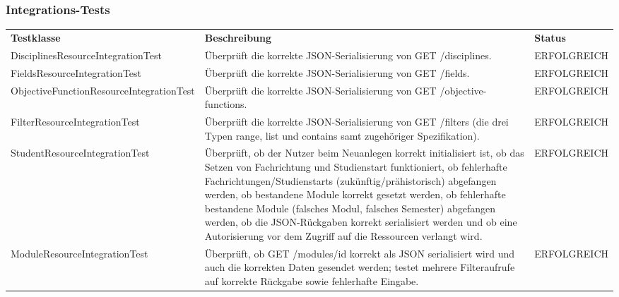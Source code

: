 \subsubsection*{Integrations-Tests}

\begin{longtable}{| >{\hspace{0pt}} p{} | >{\hspace{0pt}} p{} | >{\hspace{0pt}} p{} |}
	\hline
	\textbf{Testklasse} & \textbf{Beschreibung} & \textbf{Status} \\ 
	\hhline{|=|=|=|}  
	\endfirsthead
	\endhead
	DisciplinesResourceIntegrationTest & Überprüft die korrekte JSON-Serialisierung von GET /disciplines. & ERFOLGREICH \\
	\hline
	FieldsResourceIntegrationTest & Überprüft die korrekte JSON-Serialisierung von GET /fields. & ERFOLGREICH \\
	\hline
	ObjectiveFunctionResourceIntegrationTest & Überprüft die korrekte JSON-Serialisierung von GET /objective-functions. & ERFOLGREICH \\
	\hline
	FilterResourceIntegrationTest & Überprüft die korrekte JSON-Serialisierung von GET /filters (die drei Typen range, list und contains samt zugehöriger Spezifikation). & ERFOLGREICH \\
	\hline
	StudentResourceIntegrationTest & Überprüft, ob der Nutzer beim Neuanlegen korrekt initialisiert ist, ob das Setzen von Fachrichtung und Studienstart funktioniert, ob fehlerhafte Fachrichtungen/Studienstarts (zukünftig/prähistorisch) abgefangen werden, ob bestandene Module korrekt gesetzt werden, ob fehlerhafte bestandene Module (falsches Modul, falsches Semester) abgefangen werden, ob die JSON-Rückgaben korrekt serialisiert werden und ob eine Autorisierung vor dem Zugriff auf die Ressourcen verlangt wird. & ERFOLGREICH \\
	\hline
	ModuleResourceIntegrationTest & Überprüft, ob GET /modules/id korrekt als JSON serialisiert wird und auch die korrekten Daten gesendet werden; testet mehrere Filteraufrufe auf korrekte Rückgabe sowie fehlerhafte Eingabe. & ERFOLGREICH \\
	\hline
	

\end{longtable}

